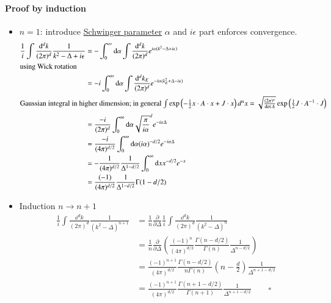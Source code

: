 \paragraph{Proof by induction}
\begin{itemize}
\item $n=1$: introduce \underline{Schwinger parameter} $\alpha$ and $i\epsilon$ part enforces convergence.
\begin{align*}
	\frac{1}{i} \int \frac{\dd^d k}{(2\pi)^d} \frac{1}{k^2 - \Delta + i\epsilon} 
	&= -\int^\infty_0 \dd \alpha \int \frac{\dd^d k}{(2\pi)^d} e^{i\alpha (k^2 - \Delta + i\epsilon)} \\
	\shortintertext{using Wick rotation}
	&= -i\int^\infty_0 \dd \alpha \int \frac{\dd^d k_E}{(2\pi)^d}e^{-i\alpha (k_E^2 + \Delta - i\epsilon)}\\
	\shortintertext{Gaussian integral in higher dimension; in general $ \int \exp\left( - \frac 1 2 x \cdot A \cdot x +J \cdot x \right) d^nx = \sqrt{\frac{(2\pi)^n}{\det A}} \exp \left( {1\over 2} J \cdot A^{-1} \cdot J \right)$}
	&= \frac{-i}{(2\pi)^d} \int^\infty_0 \dd \alpha {\sqrt{\frac{\pi}{i\alpha}}}^d e^{-i\alpha \Delta} \\
	&= \frac{-i}{(4\pi)^{d/2}} \int^\infty_0 \dd \alpha (i\alpha)^{-d/2} e^{-i\alpha \Delta} \\
	&= -\frac{1}{(4\pi)^{d/2}} \frac{1}{\Delta^{1-d/2}} \int^\infty_0 \dd x x^{-d/2} e^{-x} \\
	&= \frac{(-1)}{(4\pi)^{d/2}}\frac{1}{\Delta^{1-d/2}} \Gamma(1-d/2)
\end{align*}
\item Induction $n \rightarrow n+1$
	\begin{align*}
		\frac{1}{i} \int \frac{\dd^d k}{(2\pi)^d} \frac{1}{(k^2-\Delta)^{n+1}}
		&= \frac{1}{n} \frac{\partial}{\partial \Delta} \frac{1}{i} \int \frac{\dd^d k}{(2\pi)^d} \frac{1}{(k^2-\Delta)^n} \\
		&= \frac{1}{n} \frac{\partial}{\partial \Delta} \left( \frac{(-1)^n}{(4\pi)^{d/2}} \frac{\Gamma(n-d/2)}{\Gamma(n)} \frac{1}{\Delta^{n-d/2}} \right) \\
		&= \frac{(-1)^{n+1}}{(4\pi)^{d/2}} \frac{\Gamma(n-d/2)}{n\Gamma(n)} \left( n-\frac d 2 \right)  \frac{1}{\Delta^{n+1-d/2}} \\
		&= \frac{(-1)^{n+1}}{(4\pi)^{d/2}} \frac{\Gamma(n+1-d/2)}{\Gamma(n+1)} \frac{1}{\Delta^{n+1-d/2}} \qquad \square
	\end{align*}
\end{itemize}

